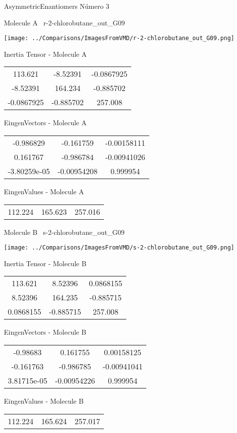 \vtab[-3cm]
\begin{center}
{\large AsymmetricEnantiomers \tab Número 3}
\end{center}
\begin{multicols}{2}
\begin{center}

Molecule A \
r-2-chlorobutane\_out\_G09

\texttt{[image: ../Comparisons/ImagesFromVMD/r-2-chlorobutane\_out\_G09.png]}

Inertia Tensor - Molecule A \\
\begin{tabular}{|c c c|}
113.621	 & 	-8.52391	 & 	-0.0867925	 \\
-8.52391	 & 	164.234	 & 	-0.885702	 \\
-0.0867925	 & 	-0.885702	 & 	257.008
\end{tabular}

\vtab
 EingenVectors - Molecule A     \\
\begin{tabular}{|c c c|}
-0.986829	 & 	-0.161759	 & 	-0.00158111	 \\
0.161767	 & 	-0.986784	 & 	-0.00941026	 \\
-3.80259e-05	 & 	-0.00954208	 & 	0.999954
\end{tabular}

\vtab
 EingenValues - Molecule A     \\
\begin{tabular}{|c c c|}
112.224	 & 	165.623	 & 	257.016	 \\
\end{tabular}
\columnbreak

Molecule B \
s-2-chlorobutane\_out\_G09

\texttt{[image: ../Comparisons/ImagesFromVMD/s-2-chlorobutane\_out\_G09.png]}

Inertia Tensor - Molecule B \\
\begin{tabular}{|c c c|}
113.621	 & 	8.52396	 & 	0.0868155	 \\
8.52396	 & 	164.235	 & 	-0.885715	 \\
0.0868155	 & 	-0.885715	 & 	257.008
\end{tabular}

\vtab
 EingenVectors - Molecule B     \\
\begin{tabular}{|c c c|}
-0.98683	 & 	0.161755	 & 	0.00158125	 \\
-0.161763	 & 	-0.986785	 & 	-0.00941041	 \\
3.81715e-05	 & 	-0.00954226	 & 	0.999954
\end{tabular}

\vtab
 EingenValues - Molecule B     \\
\begin{tabular}{|c c c|}
112.224	 & 	165.624	 & 	257.017	 \\
\end{tabular}

\end{center}
\end{multicols}

